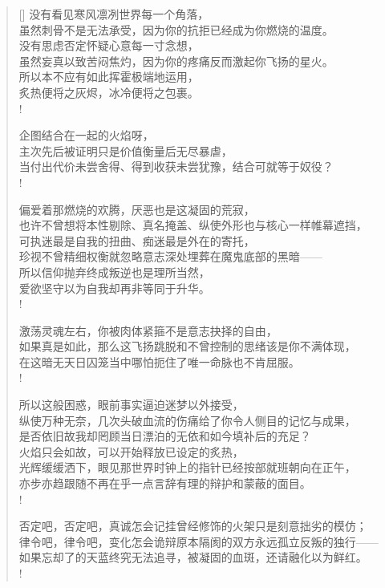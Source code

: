 \documentclass[UTF8, 12pt, a4paper]{ctexrep} %
\begin{document}
\begin{verse}[\versewidth]
没有看见寒风凛冽世界每一个角落，\\
虽然刺骨不是无法承受，因为你的抗拒已经成为你燃烧的温度。\\
没有思虑否定怀疑心意每一寸念想，\\
虽然妄真以致苦闷焦灼，因为你的疼痛反而激起你飞扬的星火。\\
所以本不应有如此挥霍极端地运用，\\
炙热便将之灰烬，冰冷便将之包裹。\\!

企图结合在一起的火焰呀，\\
主次先后被证明只是价值衡量后无尽暴虐，\\
当付出代价未尝舍得、得到收获未尝犹豫，结合可就等于奴役？\\!

偏爱着那燃烧的欢腾，厌恶也是这凝固的荒寂，\\
也许不曾想将本性剔除、真名掩盖、纵使外形也与核心一样帷幕遮挡，\\
可执迷最是自我的扭曲、痴迷最是外在的寄托，\\
珍视不曾精细权衡就忽略意志深处埋葬在魔鬼底部的黑暗——\\
所以信仰抛弃终成叛逆也是理所当然，\\
爱欲坚守以为自我却再非等同于升华。\\!

激荡灵魂左右，你被肉体紧箍不是意志抉择的自由，\\
如果真是如此，那么这飞扬跳脱和不曾控制的思绪该是你不满体现，\\
在这暗无天日囚笼当中哪怕扼住了唯一命脉也不肯屈服。\\!

所以这般困惑，眼前事实逼迫迷梦以外接受，\\
纵使万种无奈，几次头破血流的伤痛给了你令人侧目的记忆与成果，\\
是否依旧故我却罔顾当日漂泊的无依和如今填补后的充足？\\
火焰只会如故，可以开始释放已设定的炙热，\\
光辉缓缓洒下，眼见那世界时钟上的指针已经按部就班朝向在正午，\\
亦步亦趋跟随不再在乎一点言辞有理的辩护和蒙蔽的面目。\\!

否定吧，否定吧，真诚怎会记挂曾经修饰的火架只是刻意拙劣的模仿；\\
律令吧，律令吧，变化怎会诡辩原本隔阂的双方永远孤立反叛的独行——\\
如果忘却了的天蓝终究无法追寻，被凝固的血斑，还请融化以为鲜红。\\!


\end{verse}
\end{document}
